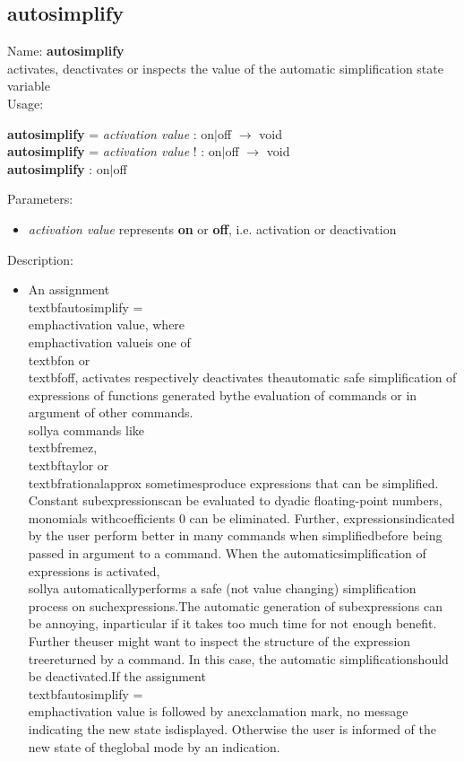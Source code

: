 \subsection{autosimplify}
\label{labautosimplify}
\noindent Name: \textbf{autosimplify}\\
activates, deactivates or inspects the value of the automatic simplification state variable\\
\noindent Usage: 
\begin{center}
\textbf{autosimplify} = \emph{activation value} : \textsf{on$|$off} $\rightarrow$ \textsf{void}\\
\textbf{autosimplify} = \emph{activation value} ! : \textsf{on$|$off} $\rightarrow$ \textsf{void}\\
\textbf{autosimplify} : \textsf{on$|$off}\\
\end{center}
Parameters: 
\begin{itemize}
\item \emph{activation value} represents \textbf{on} or \textbf{off}, i.e. activation or deactivation
\end{itemize}
\noindent Description: \begin{itemize}

\item An assignment \\textbf{autosimplify} = \\emph{activation value}, where \\emph{activation value}\n   is one of \\textbf{on} or \\textbf{off}, activates respectively deactivates the\n   automatic safe simplification of expressions of functions generated by\n   the evaluation of commands or in argument of other commands.\n    \n   \\sollya commands like \\textbf{remez}, \\textbf{taylor} or \\textbf{rationalapprox} sometimes\n   produce expressions that can be simplified. Constant subexpressions\n   can be evaluated to dyadic floating-point numbers, monomials with\n   coefficients $0$ can be eliminated. Further, expressions\n   indicated by the user perform better in many commands when simplified\n   before being passed in argument to a command. When the automatic\n   simplification of expressions is activated, \\sollya automatically\n   performs a safe (not value changing) simplification process on such\n   expressions.\n    \n   The automatic generation of subexpressions can be annoying, in\n   particular if it takes too much time for not enough benefit. Further the\n   user might want to inspect the structure of the expression tree\n   returned by a command. In this case, the automatic simplification\n   should be deactivated.\n    \n   If the assignment \\textbf{autosimplify} = \\emph{activation value} is followed by an\n   exclamation mark, no message indicating the new state is\n   displayed. Otherwise the user is informed of the new state of the\n   global mode by an indication.\n\end{itemize}
